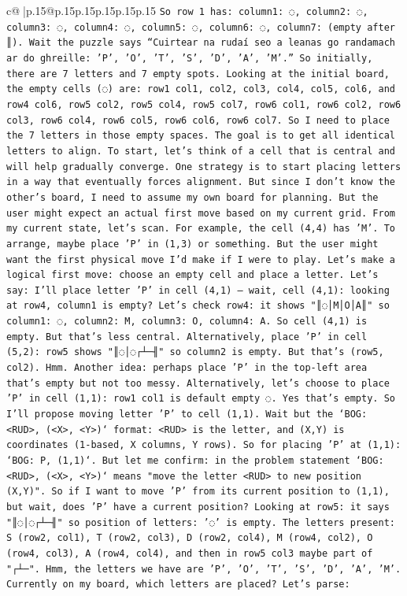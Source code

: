 \documentclass{article}
\begin{document}
{\begin{supertabular}{c@{$\;$}|p{.15\linewidth}@{}p{.15\linewidth}p{.15\linewidth}p{.15\linewidth}p{.15\linewidth}p{.15\linewidth}}
{{{\texttt{So row 1 has: column1: ◌, column2: ◌, column3: ◌, column4: ◌, column5: ◌, column6: ◌, column7: (empty after ║). Wait the puzzle says “Cuirtear na rudaí seo a leanas go randamach ar do ghreille: 'P', 'O', 'T', 'S', 'D', 'A', 'M'.” So initially, there are 7 letters and 7 empty spots. Looking at the initial board, the empty cells (◌) are: row1 col1, col2, col3, col4, col5, col6, and row4 col6, row5 col2, row5 col4, row5 col7, row6 col1, row6 col2, row6 col3, row6 col4, row6 col5, row6 col6, row6 col7. So I need to place the 7 letters in those empty spaces. The goal is to get all identical letters to align. To start, let's think of a cell that is central and will help gradually converge. One strategy is to start placing letters in a way that eventually forces alignment. But since I don't know the other's board, I need to assume my own board for planning. But the user might expect an actual first move based on my current grid. From my current state, let's scan. For example, the cell (4,4) has 'M'. To arrange, maybe place 'P' in (1,3) or something. But the user might want the first physical move I'd make if I were to play. Let's make a logical first move: choose an empty cell and place a letter. Let's say: I'll place letter 'P' in cell (4,1) – wait, cell (4,1): looking at row4, column1 is empty? Let's check row4: it shows "║◌│M│O│A║" so column1: ◌, column2: M, column3: O, column4: A. So cell (4,1) is empty. But that's less central. Alternatively, place 'P' in cell (5,2): row5 shows "║◌│◌┌┴─╢" so column2 is empty. But that's (row5, col2). Hmm. Another idea: perhaps place 'P' in the top{-}left area that's empty but not too messy. Alternatively, let's choose to place 'P' in cell (1,1): row1 col1 is default empty ◌. Yes that's empty. So I'll propose moving letter 'P' to cell (1,1). Wait but the `BOG: <RUD>, (<X>, <Y>)` format: <RUD> is the letter, and (X,Y) is coordinates (1{-}based, X columns, Y rows). So for placing 'P' at (1,1): `BOG: P, (1,1)`. But let me confirm: in the problem statement `BOG: <RUD>, (<X>, <Y>)` means "move the letter <RUD> to new position (X,Y)". So if I want to move 'P' from its current position to (1,1), but wait, does 'P' have a current position? Looking at row5: it says "║◌│◌┌┴─╢" so position of letters: '◌' is empty. The letters present: S (row2, col1), T (row2, col3), D (row2, col4), M (row4, col2), O (row4, col3), A (row4, col4), and then in row5 col3 maybe part of "┌┴─". Hmm, the letters we have are 'P', 'O', 'T', 'S', 'D', 'A', 'M'. Currently on my board, which letters are placed? Let's parse:} \\
}}}
\end{supertabular}}
\end{document}
